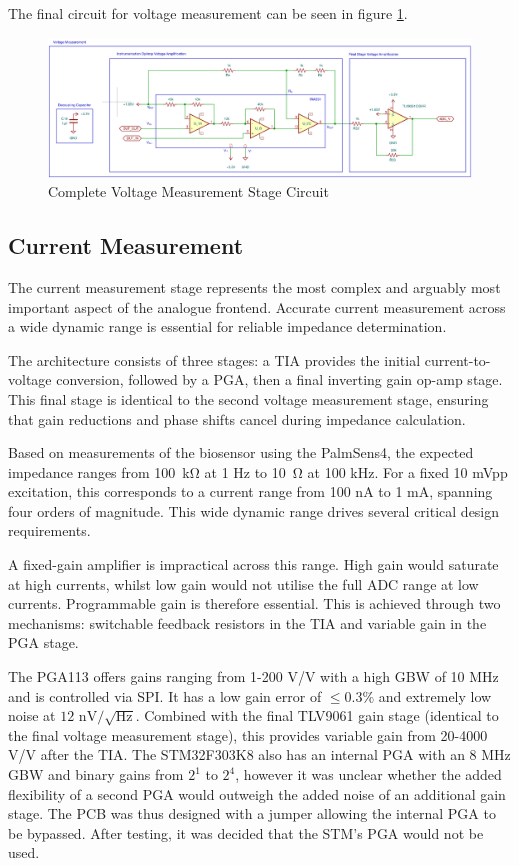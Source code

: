 The final circuit for voltage measurement can be seen in figure \ref{fig:vmeas_stage_circuit}.

\begin{figure}[H]
    \centering
    \includegraphics[width=\textwidth]{VMeasSchem.png}
    \caption{Complete Voltage Measurement Stage Circuit}
    \label{fig:vmeas_stage_circuit}
\end{figure}

\subsection{Current Measurement}\label{subsec:design_cur}
The current measurement stage represents the most complex and arguably most important aspect of the analogue frontend. Accurate current measurement across a wide dynamic range is essential for reliable impedance determination.

The architecture consists of three stages: a \ac{TIA} provides the initial current-to-voltage conversion, followed by a \ac{PGA}, then a final inverting gain op-amp stage. This final stage is identical to the second voltage measurement stage, ensuring that gain reductions and phase shifts cancel during impedance calculation.

Based on measurements of the biosensor using the PalmSens4, the expected impedance ranges from \SI{100}{\kilo\ohm} at 1 Hz to \SI{10}{\ohm} at 100 kHz. For a fixed 10 mVpp excitation, this corresponds to a current range from 100 nA to 1 mA, spanning four orders of magnitude. This wide dynamic range drives several critical design requirements.

A fixed-gain amplifier is impractical across this range. High gain would saturate at high currents, whilst low gain would not utilise the full \ac{ADC} range at low currents. Programmable gain is therefore essential. This is achieved through two mechanisms: switchable feedback resistors in the \ac{TIA} and variable gain in the \ac{PGA} stage.

The PGA113 offers gains ranging from 1-200 V/V with a high GBW of 10 MHz and is controlled via SPI. It has a low gain error of $\le0.3\%$ and extremely low noise at $12\text{ nV}/\sqrt{\text{Hz}}$. Combined with the final TLV9061 gain stage (identical to the final voltage measurement stage), this provides variable gain from 20-4000 V/V after the \ac{TIA}. The STM32F303K8 also has an internal \ac{PGA} with an 8 MHz GBW and binary gains from $2^1$ to $2^4$, however it was unclear whether the added flexibility of a second PGA would outweigh the
added noise of an additional gain stage. The PCB was thus designed with a jumper allowing the internal \ac{PGA} to be bypassed. After testing, it was decided that the STM's PGA would not be used.

